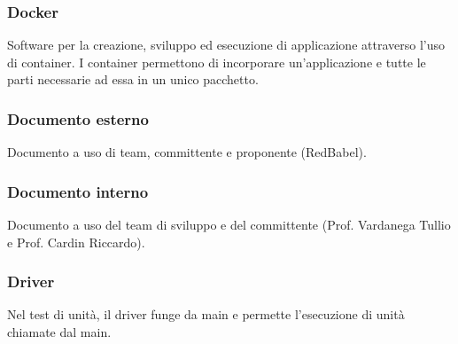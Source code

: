 \subsubsection*{Docker}
Software per la creazione, sviluppo ed esecuzione di applicazione attraverso l'uso di container. I container
permettono di incorporare un'applicazione e tutte le parti necessarie ad essa in un unico pacchetto.

\subsubsection*{Documento esterno}
Documento a uso di team, committente e proponente (RedBabel).

\subsubsection*{Documento interno}
Documento a uso del team di sviluppo e del committente (Prof. Vardanega Tullio e Prof. Cardin Riccardo).

\subsubsection*{Driver }
Nel test di unità, il driver funge da main e permette l'esecuzione di unità chiamate dal main.

